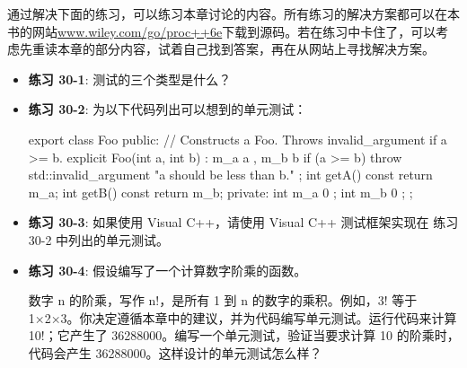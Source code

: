 通过解决下面的练习，可以练习本章讨论的内容。所有练习的解决方案都可以在本书的网站\url{www.wiley.com/go/proc++6e}下载到源码。若在练习中卡住了，可以考虑先重读本章的部分内容，试着自己找到答案，再在从网站上寻找解决方案。

\begin{itemize}
\item
\textbf{练习 30-1}: 测试的三个类型是什么？

\item
\textbf{练习 30-2}: 为以下代码列出可以想到的单元测试：

\begin{cpp}
export class Foo
{
    public:
        // Constructs a Foo. Throws invalid_argument if a >= b.
        explicit Foo(int a, int b) : m_a { a }, m_b { b }
        {
            if (a >= b) {
                throw std::invalid_argument { "a should be less than b." };
            }
        }
        int getA() const { return m_a; }
        int getB() const { return m_b; }
    private:
        int m_a { 0 };
        int m_b { 0 };
};
\end{cpp}

\item
\textbf{练习 30-3}: 如果使用 Visual C++，请使用 Visual C++ 测试框架实现在 练习 30-2 中列出的单元测试。

\item
\textbf{练习 30-4}: 假设编写了一个计算数字阶乘的函数。

数字 n 的阶乘，写作 n!，是所有 1 到 n 的数字的乘积。例如，3! 等于 1×2×3。你决定遵循本章中的建议，并为代码编写单元测试。运行代码来计算 10!；它产生了 36288000。编写一个单元测试，验证当要求计算 10 的阶乘时，代码会产生 36288000。这样设计的单元测试怎么样？
\end{itemize}
